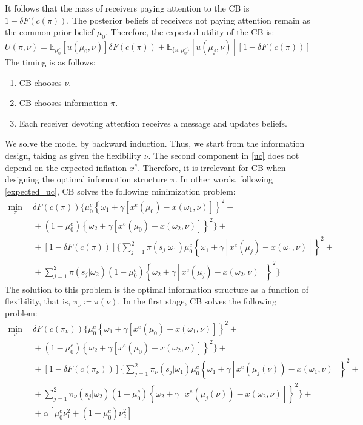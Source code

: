 \documentclass[12pt,a4paper]{article}
\begin{document}
It follows that the mass of receivers paying attention to the CB is $1-\delta F(c(\pi))$. The posterior beliefs of receivers not paying attention remain as the common prior belief $\mu_0$. Therefore, the expected utility of the CB is:
\begin{equation}
\label{expected_uc}
U(\pi,\nu)=\mathbb{E}_{\mu_0^c}[u(\mu_0,\nu)]\delta F(c(\pi)) + \mathbb{E}_{\{\pi,\mu_0^c\}}[u(\mu_j,\nu)][1-\delta F(c(\pi))]
\end{equation}
The timing is as follows:
\begin{enumerate}
    \item CB chooses $\nu$.
    \item CB chooses information $\pi$.
    \item Each receiver devoting attention receives a message and updates beliefs.
\end{enumerate}
We solve the model by backward induction. Thus, we start from the information design, taking as given the flexibility $\nu$. The second component in \eqref{uc} does not depend on the expected inflation $x^e$. Therefore, it is irrelevant for CB when designing the optimal information structure $\pi$. In other words, following \eqref{expected_uc}, CB solves the following minimization problem:
\begin{equation}
\label{minproblem}
    \begin{split}
    \min_{\pi} \ & \ \delta F(c(\pi))\Bigg\{\mu_0^c\left\{\omega_1+\gamma\left[x^e(\mu_0)-x(\omega_1,\nu)\right]\right\}^2+\\
    \ & \ +(1-\mu_0^c)\left\{\omega_2+\gamma\left[x^e(\mu_0)-x(\omega_2,\nu)\right]\right\}^2\Bigg\}+\\
    \ & \ +[1-\delta F(c(\pi))]\Bigg\{\sum_{j=1}^{2}\pi(s_j|\omega_1)\mu_0^c\left\{\omega_1+\gamma\left[x^e(\mu_j)-x(\omega_1,\nu)\right]\right\}^2+ \\
    \ & \ + \sum_{j=1}^{2}\pi(s_j|\omega_2)(1-\mu_0^c)\left\{\omega_2+\gamma\left[x^e(\mu_j)-x(\omega_2,\nu)\right]\right\}^2\Bigg\}
    \end{split}
\end{equation}
The solution to this problem is the optimal information structure as a function of flexibility, that is, $\pi_\nu\coloneqq\pi(\nu)$.
In the first stage, CB solves the following problem:
\begin{equation}
\label{minproblem2}
    \begin{split}
    \min_{\nu} \ & \ \delta F(c(\pi_\nu))\Bigg\{\mu_0^c\left\{\omega_1+\gamma\left[x^e(\mu_0)-x(\omega_1,\nu)\right]\right\}^2+\\
    \ & \ +(1-\mu_0^c)\left\{\omega_2+\gamma\left[x^e(\mu_0)-x(\omega_2,\nu)\right]\right\}^2\Bigg\}+ \\
    \ & \ +[1-\delta F(c(\pi_\nu))]\Bigg\{\sum_{j=1}^{2}\pi_\nu(s_j|\omega_1)\mu_0^c\left\{\omega_1+\gamma\left[x^e(\mu_j(\nu))-x(\omega_1,\nu)\right]\right\}^2+\\
    \ & \ + \sum_{j=1}^{2}\pi_\nu(s_j|\omega_2)(1-\mu_0^c)\left\{\omega_2+\gamma\left[x^e(\mu_j(\nu))-x(\omega_2,\nu)\right]\right\}^2\Bigg\}+ \\
    \ & \ +\alpha [\mu_0^c\nu_1^2+(1-\mu_0^c)\nu_2^2]
    \end{split}
\end{equation}
\end{document}
